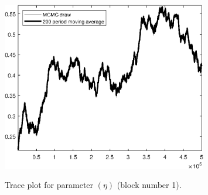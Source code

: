 \begin{figure}[H]
\centering
  \includegraphics[width=0.8\textwidth]{BRS_growth_ext_shopping/graphs/TracePlot_eta_blck_1}\\
    \caption{Trace plot for parameter $(\eta)$ (block number 1).}
\end{figure}
